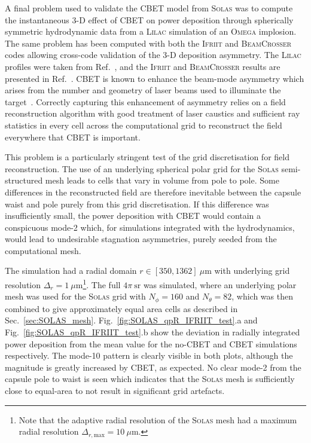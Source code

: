 A final problem used to validate the \ac{CBET} model from \textsc{Solas} was to compute the instantaneous 3-D effect of \ac{CBET} on power deposition through spherically symmetric hydrodynamic data from a \textsc{Lilac} simulation of an \textsc{Omega} implosion.
The same problem has been computed with both the \textsc{Ifriit} and \textsc{BeamCrosser} codes allowing cross-code validation of the 3-D deposition asymmetry.
The \textsc{Lilac} profiles were taken from Ref.~\cite{colaitis_inverse_2021}, and the \textsc{Ifriit} and \textsc{BeamCrosser} results are presented in Ref.~\cite{colaitis_3d_2023}.
\ac{CBET} is known to enhance the beam-mode asymmetry which arises from the number and geometry of laser beams used to illuminate the target~\cite{edgell_mitigation_2017}.
Correctly capturing this enhancement of asymmetry relies on a field reconstruction algorithm with good treatment of laser caustics and sufficient ray statistics in every cell across the computational grid to reconstruct the field everywhere that \ac{CBET} is important.

This problem is a particularly stringent test of the grid discretisation for field reconstruction.
The use of an underlying spherical polar grid for the \textsc{Solas} semi-structured mesh leads to cells that vary in volume from pole to pole.
Some differences in the reconstructed field are therefore inevitable between the capsule waist and pole purely from this grid discretisation.
If this difference was insufficiently small, the power deposition with \ac{CBET} would contain a conspicuous mode-2 which, for simulations integrated with the hydrodynamics, would lead to undesirable stagnation asymmetries, purely seeded from the computational mesh.

The simulation had a radial domain $r\in[350,1362]\ \mu\text{m}$ with underlying grid resolution $\Delta_r=1\ \mu\text{m}$\footnote{Note that the adaptive radial resolution of the \textsc{Solas} mesh had a maximum radial resolution $\Delta_{r,\text{max}}=10\ \mu\text{m}$.}.
The full $4\pi\ \text{sr}$ was simulated, where an underlying polar mesh was used for the \textsc{Solas} grid with $N_{\phi}=160$ and $N_{\theta}=82$, which was then combined to give approximately equal area cells as described in Sec.~\ref{sec:SOLAS_mesh}.
Fig.~\ref{fig:SOLAS_qpR_IFRIIT_test}.a and Fig.~\ref{fig:SOLAS_qpR_IFRIIT_test}.b show the deviation in radially integrated power deposition from the mean value for the no-\ac{CBET} and \ac{CBET} simulations respectively.
The mode-10 pattern is clearly visible in both plots, although the magnitude is greatly increased by \ac{CBET}, as expected.
No clear mode-2 from the capsule pole to waist is seen which indicates that the \textsc{Solas} mesh is sufficiently close to equal-area to not result in significant grid artefacts.

